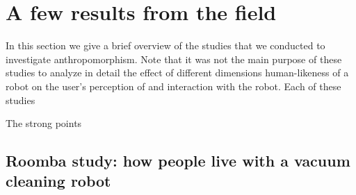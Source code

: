 \documentclass{frontiersSCNS} %
\begin{document}


%
%
%
%
%
%

\section{A few results from the field}
\label{sec:overview-studies}

In this section we give a brief overview of the studies that we conducted to investigate anthropomorphism. Note that it was not the main purpose of these studies to analyze in detail the effect of different dimensions human-likeness of a robot on the user's perception of and interaction with the robot. Each of these studies 

The strong points 


\subsection{Roomba study: how people live with a vacuum cleaning robot}
\end{document}
